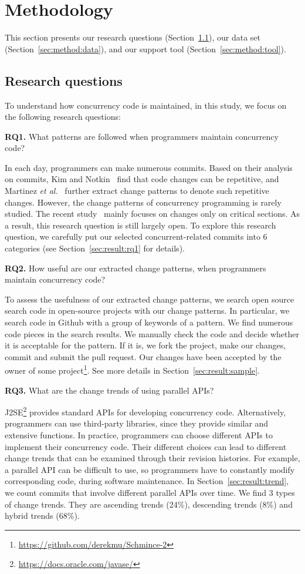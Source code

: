 \section{Methodology}
\label{sec:method}
This section presents our research questions (Section~\ref{sec:method:rq}), our data set (Section~\ref{sec:method:data}), and our support tool (Section~\ref{sec:method:tool}).
\subsection{Research questions}
\label{sec:method:rq}
To understand how concurrency code is maintained, in this study, we focus on the following research questions:

\textbf{RQ1.} What patterns are followed when programmers maintain concurrency code?

In each day, programmers can make numerous commits. Based on their analysis on commits, Kim and Notkin~\cite{conf/icse/KimN09} find that code changes can be repetitive, and Martinez \emph{et al.}~\cite{conf/icsm/MartinezDM13} further extract change patterns to denote such repetitive changes. However, the change patterns of concurrency programming is rarely studied. The recent study~\cite{conf/sigsoft/GuJSZL15} mainly focuses on changes only on critical sections. As a result, this research question is still largely open. To explore this research question, we carefully put our selected concurrent-related commits into 6 categories (see Section~\ref{sec:result:rq1} for details).

\textbf{RQ2.} How useful are our extracted change patterns, when programmers maintain concurrency code?

To assess the usefulness of our extracted change patterns, we search open source search code in open-source projects with our change patterns. In particular, we search code in Github with a group of keywords of a pattern. We find numerous code pieces in the search results. We manually check the code and decide whether it is acceptable for the pattern. If it is, we fork the project, make our changes, commit and submit the pull request. Our changes have been accepted by the owner of some project\footnote{\url{https://github.com/derekmu/Schmince-2}}. See more details in Section~\ref{sec:result:sample}.

\textbf{RQ3.} What are the change trends of using parallel APIs?

J2SE\footnote{\url{https://docs.oracle.com/javase/}} provides standard APIs for developing concurrency code. Alternatively, programmers can use third-party libraries, since they provide similar and extensive functions. In practice, programmers can choose different APIs to implement their concurrency code. Their different choices can lead to different change trends that can be examined through their revision histories. For example, a parallel API can be difficult to use, so programmers have to constantly modify corresponding code, during software maintenance. In Section~\ref{sec:result:trend}, we count commits that involve different parallel APIs over time. We find 3 types of change trends. They are ascending trends (24\%), descending trends (8\%) and hybrid trends (68\%).%

